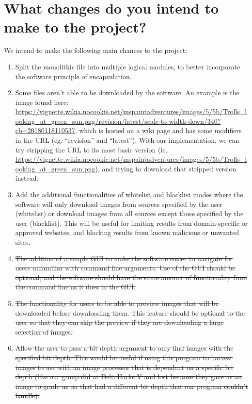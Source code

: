 \documentclass[12pt]{article}
\begin{document}
\section* {What changes do you intend to make to the project?}
We intend to make the following main chances to the project: \\
\begin{enumerate}
\item Split the monolithic file into multiple logical modules, to better incorporate the software principle of encapsulation.

\item Some files aren’t able to be downloaded by the software. An example is the image found here: \url{ https://vignette.wikia.nocookie.net/mspaintadventures/images/5/5b/Trolls_looking_at_green_sun.png/revision/latest/scale-to-width-down/340?cb=20180118110537}, which is hosted on a wiki page and has some modifiers in the URL (eg. “revision” and “latest”). With our implementation, we can try stripping the URL to its most basic version (ie. \url{https://vignette.wikia.nocookie.net/mspaintadventures/images/5/5b/Trolls_looking_at_green_sun.png}), and trying to download that stripped version instead.

\item Add the additional functionalities of whitelist and blacklist modes where the software will only download images from sources specified by the user (whitelist) or download images from all sources except those specified by the user (blacklist). This will be useful for limiting results from domain-specific or approved websites, and blocking results from known malicious or unwanted sites.

\color{red}
\item \sout{The addition of a simple GUI to make the software easier to navigate for users unfamiliar with command line arguments. Use of the GUI should be optional, and the software should have the same amount of functionality from the command line as it does in the GUI.}

\item \sout{The functionality for users to be able to preview images that will be downloaded before downloading them. This feature should be optional to the user so that they can skip the preview if they are downloading a large selection of images.}

\item \sout{Allow the user to pass a bit depth argument to only find images with the specified bit depth. This would be useful if using this program to harvest images to use with an image processor that is dependant on a specific bit depth (like our group did at DeltaHacks V and lost because they gave us an image to grade us on that had a different bit depth that our program couldn’t handle).}
\color{black}

\end{enumerate}
\end{document}
